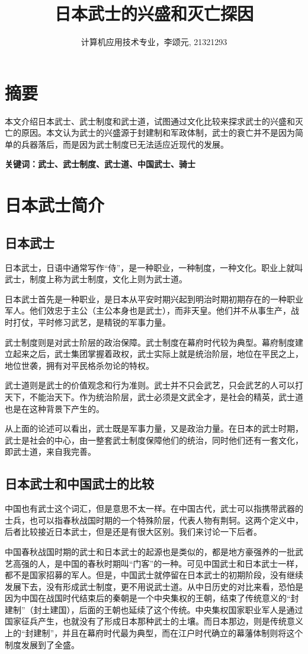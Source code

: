 \documentclass[utf8]{ctexart}
\title{日本武士的兴盛和灭亡探因}
\author{计算机应用技术专业，李颂元, 21321293}
\begin{document}
\maketitle
\section*{摘要}
本文介绍日本武士、武士制度和武士道，试图通过文化比较来探求武士的兴盛和灭亡的原因。本文认为武士的兴盛源于封建制和军政体制，武士的衰亡并不是因为简单的兵器落后，而是因为武士制度已无法适应近现代的发展。

\textbf{关键词：武士、武士制度、武士道、中国武士、骑士}
\tableofcontents
\section{日本武士简介}
\subsection{日本武士}
日本武士，日语中通常写作“侍”，是一种职业，一种制度，一种文化。职业上就叫武士，制度上称为武士制度，文化上则为武士道。

日本武士首先是一种职业，是日本从平安时期兴起到明治时期初期存在的一种职业军人。他们效忠于主公（主公本身也是武士），而非天皇。他们并不从事生产，战时打仗，平时修习武艺，是精锐的军事力量。

武士制度则是对武士阶层的政治保障。武士制度在幕府时代较为典型。幕府制度建立起来之后，武士集团掌握着政权，武士实际上就是统治阶层，地位在平民之上，地位世袭，拥有对平民格杀勿论的特权\cite{}。

武士道则是武士的价值观念和行为准则。武士并不只会武艺，只会武艺的人可以打天下，不能治天下。作为统治阶层，武士必须是文武全才，是社会的精英，武士道也是在这种背景下产生的。

从上面的论述可以看出，武士既是军事力量，又是政治力量。在日本的武士时期，武士是社会的中心，由一整套武士制度保障他们的统治，同时他们还有一套文化，即武士道，来自我完善。
\subsection{日本武士和中国武士的比较}
中国也有武士这个词汇，但是意思不太一样。在中国古代，武士可以指携带武器的士兵，也可以指春秋战国时期的一个特殊阶层，代表人物有荆轲。这两个定义中，后者比较接近日本武士，但是还是有很大区别。我们来讨论一下后者。

中国春秋战国时期的武士和日本武士的起源也是类似的，都是地方豪强养的一批武艺高强的人，是中国的春秋时期叫“门客”的一种。可见中国武士和日本武士一样，都不是国家招募的军人。但是，中国武士就停留在日本武士的初期阶段，没有继续发展下去，没有形成武士制度，更不用说武士道。从中日历史的对比来看，恐怕是因为中国在战国时代结束后的秦朝是一个中央集权的王朝，结束了传统意义的“封建制”（封土建国），后面的王朝也延续了这个传统。中央集权国家职业军人是通过国家征兵产生，也就没有了形成日本那种武士的土壤。而日本那边，则是传统意义上的“封建制”，并且在幕府时代最为典型，而在江户时代确立的幕藩体制则将这个制度发展到了全盛。
\end{document}
